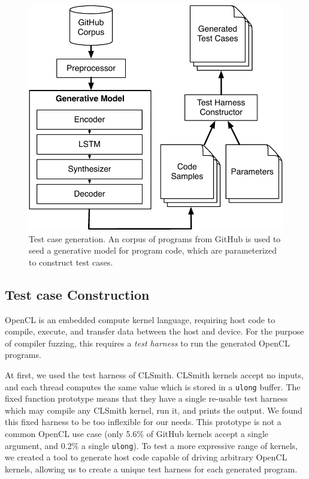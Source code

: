 
\begin{figure}
  \centering
  \includegraphics[width=.80\columnwidth]{img/deepsmith} %
  \caption{%
    Test case generation. An corpus of programs from GitHub is used to seed a generative model for program code, which are parameterized to construct test cases.%
  }%
  \label{fig:deeptune}
\end{figure}


\subsection{Test case Construction}

OpenCL is an embedded compute kernel language, requiring host code to compile, execute, and transfer data between the host and device. For the purpose of compiler fuzzing, this requires a \emph{test harness} to run the generated OpenCL programs.

At first, we used the test harness of CLSmith. CLSmith kernels accept no inputs, and each thread computes the same value which is stored in a \texttt{ulong} buffer. The fixed function prototype means that they have a single re-usable test harness which may compile any CLSmith kernel, run it, and prints the output. We found this fixed harness to be too inflexible for our needs. This prototype is not a common OpenCL use case (only 5.6\% of GitHub kernels accept a single argument, and 0.2\% a single \texttt{ulong}).
To test a more expressive range of kernels, we created a tool to generate host code capable of driving arbitrary OpenCL kernels, allowing us to create a unique test harness for each generated program.

